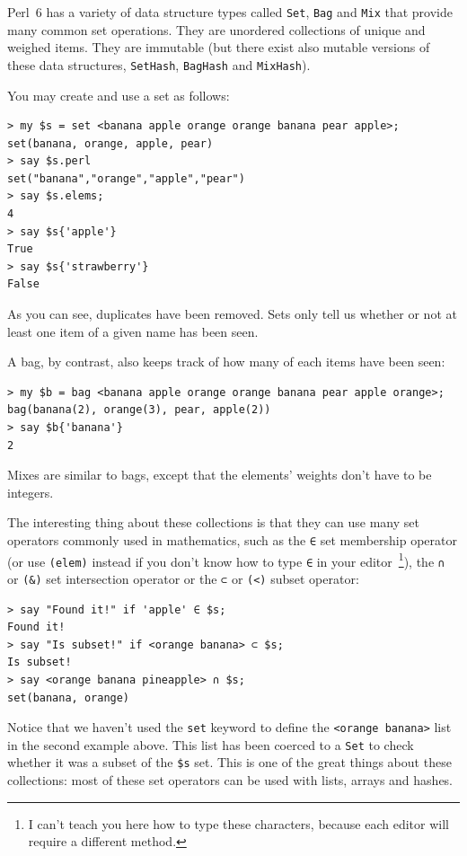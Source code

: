 Perl~6 has a variety of data structure types called {\tt Set}, 
{\tt Bag} and {\tt Mix} that provide many common set 
operations. They are unordered collections of unique and 
weighed items. They are immutable (but there exist also mutable 
versions of these data structures, {\tt SetHash}, {\tt BagHash} 
and {\tt MixHash}).

You may create and use a set as follows:

\begin{verbatim}
> my $s = set <banana apple orange orange banana pear apple>;
set(banana, orange, apple, pear)
> say $s.perl
set("banana","orange","apple","pear")
> say $s.elems;
4
> say $s{'apple'}
True
> say $s{'strawberry'}
False
\end{verbatim}
%
As you can see, duplicates have been removed. Sets only tell us 
whether or not at least one item of a given name has been seen.

A bag, by contrast, also keeps track of how many of each items 
have been seen:

\begin{verbatim}
> my $b = bag <banana apple orange orange banana pear apple orange>;
bag(banana(2), orange(3), pear, apple(2))
> say $b{'banana'}
2
\end{verbatim} 

Mixes are similar to bags, except that the elements' weights don't 
have to be integers.

The interesting thing about these collections is that they can use 
many set operators commonly used in mathematics, such as the 
\verb'∈' set membership operator (or use \verb'(elem)' instead 
if you don't know how to type \verb'∈' in your 
editor~\footnote{I can't teach you here how to type these characters, 
because each editor will require a different method.}), the \verb'∩' or 
\verb'(&)' set intersection operator or the \verb'⊂' or 
\verb'(<)' subset operator:

\begin{verbatim}
> say "Found it!" if 'apple' ∈ $s;
Found it!
> say "Is subset!" if <orange banana> ⊂ $s;
Is subset!
> say <orange banana pineapple> ∩ $s;
set(banana, orange)
\end{verbatim}

Notice that we haven't used the {\tt set} keyword to define the 
\verb'<orange banana>' list in the second example above. This list 
has been coerced to a {\tt Set} to check whether it was a subset 
of the \verb'$s' set. This is one of the great things about these 
collections: most of these set operators can be used with lists, 
arrays and hashes.

